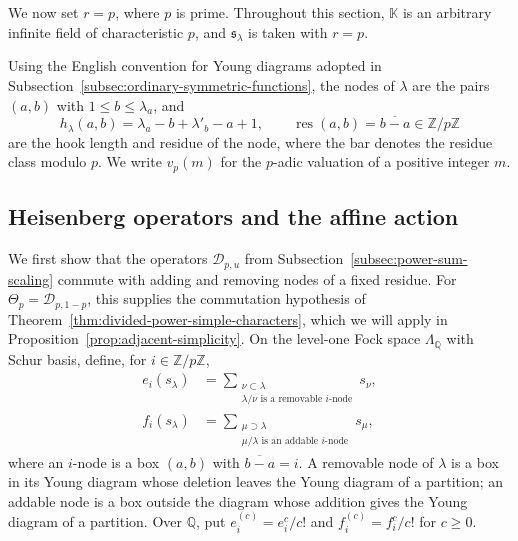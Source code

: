 \documentclass[12pt,reqno,a4paper]{amsart}
\numberwithin{equation}{section}
\numberwithin{figure}{section}
\theoremstyle{plain}
\theoremstyle{definition}
\begin{document}
We now set $r=p$, where $p$ is prime.  Throughout this section,
$\mathbb K$ is an arbitrary infinite field of characteristic $p$, and
$\mathfrak{s}_\lambda$ is taken with $r=p$.

Using the English convention for Young diagrams adopted in
Subsection~\ref{subsec:ordinary-symmetric-functions}, the nodes of
$\lambda$ are the pairs $(a,b)$ with $1\leq b\leq\lambda_a$, and
\begin{equation}\label{eq:hook-residue-conventions}
h_\lambda(a,b)=\lambda_a-b+\lambda'_b-a+1,
\qquad
\operatorname{res}(a,b)=\overline{b-a}\in\mathbb Z/p\mathbb Z
\end{equation}
are the hook length and residue of the node, where the bar denotes
the residue class modulo $p$.  We write
$v_p(m)$ for the $p$-adic valuation of a positive integer $m$.

\subsection{Heisenberg operators and the affine action}
\label{subsec:affine-intertwiners}

We first show that the operators $\mathcal D_{p,u}$ from
Subsection~\ref{subsec:power-sum-scaling} commute with adding and
removing nodes of a fixed residue.  For $\Theta_p=\mathcal D_{p,1-p}$,
this supplies the commutation hypothesis of
Theorem~\ref{thm:divided-power-simple-characters}, which we will apply
in Proposition~\ref{prop:adjacent-simplicity}.  On the
level-one Fock space $\Lambda_{\mathbb Q}$ with Schur basis, define,
for $i\in\mathbb Z/p\mathbb Z$,
\begin{equation}\label{eq:refaudit-chevalley-operators}
\begin{aligned}
e_i(s_\lambda)
&=\sum_{\substack{\nu\subset\lambda\\
\lambda/\nu\text{ is a removable }i\text{-node}}}s_\nu,\\
f_i(s_\lambda)
&=\sum_{\substack{\mu\supset\lambda\\
\mu/\lambda\text{ is an addable }i\text{-node}}}s_\mu,
\end{aligned}
\end{equation}
where an $i$-node is a box $(a,b)$ with $\overline{b-a}=i$.
A removable node of $\lambda$ is a box in its Young diagram whose
deletion leaves the Young diagram of a partition; an addable node is
a box outside the diagram whose addition gives the Young diagram of
a partition.  Over $\mathbb Q$, put
$e_i^{(c)}=e_i^c/c!$ and $f_i^{(c)}=f_i^c/c!$ for $c\geq0$.
\end{document}
